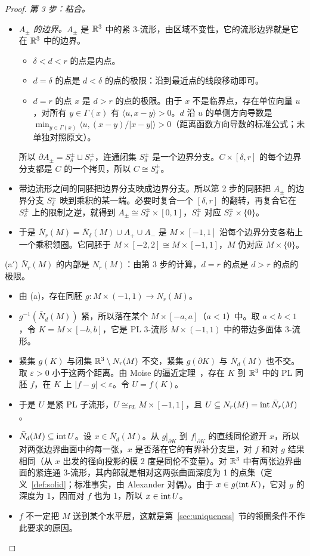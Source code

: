 \begin{proof}
\emph{第 3 步：粘合。}
\begin{itemize}
\item \emph{$A_\pm$ 的边界。}$A_\pm$ 是 $\mathbb{R}^3$ 中的紧 3-流形，由区域不变性，它的流形边界就是它在 $\mathbb{R}^3$ 中的边界。
  \begin{itemize}
  \item $\delta<d<r$ 的点是内点。
  \item $d=\delta$ 的点是 $d<\delta$ 的点的极限：沿到最近点的线段移动即可。
  \item $d=r$ 的点 $x$ 是 $d>r$ 的点的极限。由于 $x$ 不是临界点，存在单位向量 $u$，对所有 $y\in\Gamma(x)$ 有 $\langle u,x-y\rangle>0$。$d$ 沿 $u$ 的单侧方向导数是 $\min_{y\in\Gamma(x)}\langle u,(x-y)/|x-y|\rangle>0$（距离函数方向导数的标准公式；未单独对照原文）。
  \end{itemize}
  所以 $\partial A_\pm=S^\pm_\delta\sqcup S^\pm_r$，连通闭集 $S^\pm_\delta$ 是一个边界分支。$C\times[\delta,r]$ 的每个边界分支都是 $C$ 的一个拷贝，所以 $C\cong S^\pm_\delta$。
\item 带边流形之间的同胚把边界分支映成边界分支。所以第 2 步的同胚把 $A_\pm$ 的边界分支 $S^\pm_\delta$ 映到乘积的某一端。必要时复合一个 $[\delta,r]$ 的翻转，再复合它在 $S^\pm_\delta$ 上的限制之逆，就得到 $A_\pm\cong S^\pm_\delta\times[0,1]$，$S^\pm_\delta$ 对应 $S^\pm_\delta\times\{0\}$。
\item 于是 $\bar N_r(M)=\bar N_\delta(M)\cup A_+\cup A_-$ 是 $M\times[-1,1]$ 沿每个边界分支各粘上一个乘积领圈。它同胚于 $M\times[-2,2]\cong M\times[-1,1]$，$M$ 仍对应 $M\times\{0\}$。
\end{itemize}

(a$'$) $\bar N_r(M)$ 的内部是 $N_r(M)$：由第 3 步的计算，$d=r$ 的点是 $d>r$ 的点的极限。
\begin{itemize}
\item 由 (a)，存在同胚 $g\colon M\times(-1,1)\to N_r(M)$。
\item $g^{-1}(\bar N_d(M))$ 紧，所以落在某个 $M\times[-a,a]$（$a<1$）中。取 $a<b<1$，令 $K=M\times[-b,b]$，它是 PL 3-流形 $M\times(-1,1)$ 中的带边多面体 3-流形。
\item 紧集 $g(K)$ 与闭集 $\mathbb{R}^3\setminus N_r(M)$ 不交，紧集 $g(\partial K)$ 与 $\bar N_d(M)$ 也不交。取 $\varepsilon>0$ 小于这两个距离。由 Moise 的逼近定理~\cite[Thm.~35.2]{Moise77}，存在 $K$ 到 $\mathbb{R}^3$ 中的 PL 同胚 $f$，在 $K$ 上 $|f-g|<\varepsilon$。令 $U=f(K)$。
\item 于是 $U$ 是紧 PL 子流形，$U\cong_{PL}M\times[-1,1]$，且 $U\subseteq N_r(M)=\operatorname{int}\bar N_r(M)$。
\item $\bar N_d(M)\subseteq\operatorname{int} U$。设 $x\in\bar N_d(M)$。从 $g|_{\partial K}$ 到 $f|_{\partial K}$ 的直线同伦避开 $x$，所以对两张边界曲面中的每一张，$x$ 是否落在它的有界补分支里，对 $f$ 和对 $g$ 结果相同（从 $x$ 出发的径向投影的模 2 度是同伦不变量）。对 $\mathbb{R}^3$ 中有两张边界曲面的紧连通 3-流形，其内部就是相对这两张曲面深度为 1 的点集（定义~\ref{def:solid}；标准事实，由 Alexander 对偶）。由于 $x\in g(\operatorname{int} K)$，它对 $g$ 的深度为 1，因而对 $f$ 也为 1，所以 $x\in\operatorname{int} U$。
\item $f$ 不一定把 $M$ 送到某个水平层，这就是第~\ref{sec:uniqueness}~节的领圈条件不作此要求的原因。
\end{itemize}


\end{proof}
